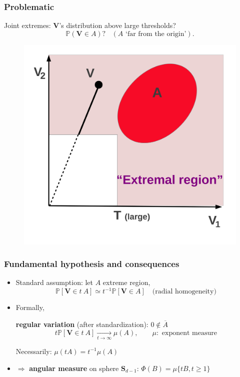 \documentclass[10pt]{beamer}
\def\mb{\mathbf}
\begin{document}
\begin{frame}
\frametitle{Problematic}
\vspace{0.2cm}
Joint extremes: $\mb V$'s distribution above large thresholds? 
\vspace{0.2cm}
    $$
    \mathbb{P}(\mb V\in A) \text{?} ~~~~ (A  \text{ `far from the origin'}).
    $$
  \begin{figure}
    \centering
    \includegraphics[scale=0.3]{sourcefigs/application4.png}
  \end{figure}
\end{frame}

\begin{frame}
  \frametitle{Fundamental hypothesis and consequences}%

  \begin{itemize}
\item Standard assumption: let $A$ extreme region, $$\mathbb{P}[\mb V\in t~A] \simeq t^{-1}\mathbb{P}[\mb V\in A] \quad \text{(radial homogeneity)} $$ 
\item Formally,
\begin{exampleblock}{\textbf{regular variation} (after standardization):}
 $0 \notin \overline A$ $$ t \mathbb{P}[\mb V\in t~A]\xrightarrow[t\to\infty]{}
 \mu(A),\qquad\mu:\text{ exponent measure} $$
\end{exampleblock}
   Necessarily: $\mu(tA) = t^{-1} \mu(A)$ 

\vspace*{1cm}
\item
 $\Rightarrow $ \textbf{angular measure} on sphere $\mb S_{d-1}$: 
    $ \Phi(B) =\mu\{t B, t\ge 1\} %
    $ 
\end{itemize}
\end{frame}
\end{document}
